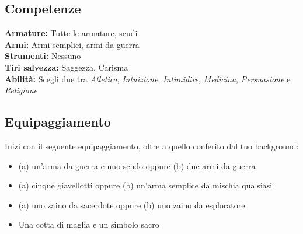 \documentclass[a4paper,10pt,twoside,twocolumn,openany,bg=full,nodeprecatedcode]{dndbook}
\begin{document}
\subsection{Competenze}\label{competenze}
\textbf{Armature:} Tutte le armature, scudi \\ \textbf{Armi:} Armi semplici, armi da guerra \\ \textbf{Strumenti:} Nessuno \\ \textbf{Tiri salvezza:} Saggezza, Carisma \\ \textbf{Abilità:} Scegli due tra \emph{Atletica}, \emph{Intuizione}, \emph{Intimidire}, \emph{Medicina}, \emph{Persuasione} e \emph{Religione}

\subsection{Equipaggiamento}\label{equipaggiamento}
Inizi con il seguente equipaggiamento, oltre a quello conferito dal tuo background:

\begin{itemize}
  \item (a) un'arma da guerra e uno scudo oppure (b) due armi da guerra
  \item (a) cinque giavellotti oppure (b) un'arma semplice da mischia qualsiasi
  \item (a) uno zaino da sacerdote oppure (b) uno zaino da esploratore
  \item Una cotta di maglia e un simbolo sacro
\end{itemize}
\end{document}
